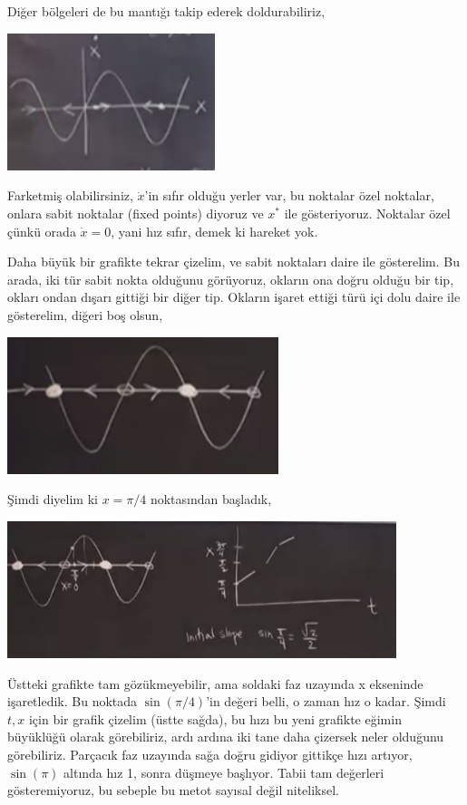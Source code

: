 \documentclass[12pt,fleqn]{article}\usepackage{../../common}
\begin{document}
Diğer bölgeleri de bu mantığı takip ederek doldurabiliriz, 

\includegraphics[height=4cm]{1_04.png}

Farketmiş olabilirsiniz, $\dot{x}$'in sıfır olduğu yerler var, bu noktalar
özel noktalar, onlara sabit noktalar (fixed points) diyoruz ve $x^*$ ile
gösteriyoruz. Noktalar özel çünkü orada $\dot{x}=0$, yani hız sıfır, demek
ki hareket yok. 

Daha büyük bir grafikte tekrar çizelim, ve sabit noktaları daire ile
gösterelim. Bu arada, iki tür sabit nokta olduğunu görüyoruz, okların ona
doğru olduğu bir tip, okları ondan dışarı gittiği bir diğer tip. Okların
işaret ettiği türü içi dolu daire ile gösterelim, diğeri boş olsun,

\includegraphics[height=4cm]{1_05.png}

Şimdi diyelim ki $x=\pi/4$ noktasından başladık, 

\includegraphics[height=4cm]{1_06.png}

Üstteki grafikte tam gözükmeyebilir, ama soldaki faz uzayında x ekseninde
işaretledik. Bu noktada $\sin(\pi/4)$'in değeri belli, o zaman hız o
kadar. Şimdi $t,x$ için bir grafik çizelim (üstte sağda), bu hızı bu yeni
grafikte eğimin büyüklüğü olarak görebiliriz, ardı ardına iki tane daha
çizersek neler olduğunu görebiliriz. Parçacık faz uzayında sağa doğru
gidiyor gittikçe hızı artıyor, $\sin(\pi)$ altında hız 1, sonra düşmeye
başlıyor. Tabii tam değerleri gösteremiyoruz, bu sebeple bu metot
sayısal değil niteliksel. 
\end{document}
